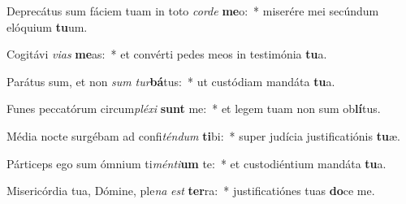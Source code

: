 \item Deprecátus sum fáciem tuam in toto \textit{cor}\textit{de} \textbf{me}o:~* miserére mei secúndum elóquium \textbf{tu}um.
\item Cogitávi \textit{vi}\textit{as} \textbf{me}as:~* et convérti pedes meos in testimónia \textbf{tu}a.
\item Parátus sum, et non \textit{sum} \textit{tur}\textbf{bá}tus:~* ut custódiam mandáta \textbf{tu}a.
\item Funes peccatórum circum\textit{plé}\textit{xi} \textbf{sunt} me:~* et legem tuam non sum ob\textbf{lí}tus.
\item Média nocte surgébam ad confi\textit{tén}\textit{dum} \textbf{ti}bi:~* super judícia justificatiónis \textbf{tu}æ.
\item Párticeps ego sum ómnium ti\textit{mén}\textit{ti}\textbf{um} te:~* et custodiéntium mandáta \textbf{tu}a.
\item Misericórdia tua, Dómine, ple\textit{na} \textit{est} \textbf{ter}ra:~* justificatiónes tuas \textbf{do}ce me.
